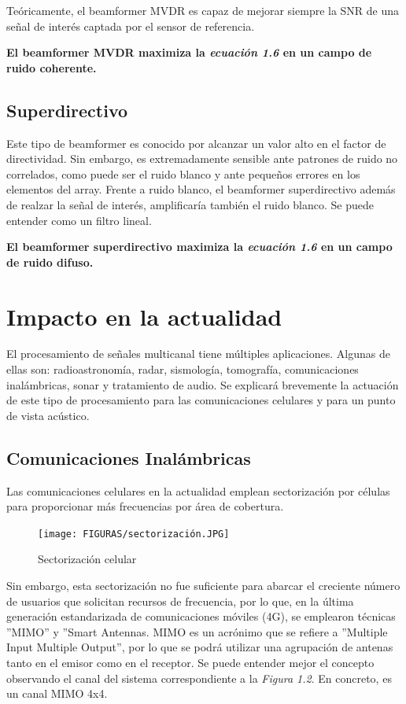 \documentclass[a4paper,11pt]{book}
\begin{document}
	Teóricamente, el beamformer MVDR es capaz de mejorar siempre la SNR de una señal de interés captada por el sensor de referencia.
	
	\textbf{		El beamformer MVDR maximiza la \textit{ecuación 1.6} en un campo de ruido coherente.}
	
	\subsection{Superdirectivo}
	Este tipo de beamformer es conocido por alcanzar un valor alto en el factor de directividad. Sin embargo, es extremadamente sensible ante patrones de ruido no correlados, como puede ser el ruido blanco y ante pequeños errores en los elementos del array. Frente a ruido blanco, el beamformer superdirectivo además de realzar la señal de interés, amplificaría también el ruido blanco. Se puede entender como un filtro lineal.
	
	\textbf{		El beamformer superdirectivo maximiza la \textit{ecuación 1.6} en un campo de ruido difuso.}
	
	\section{Impacto en la actualidad}
	El procesamiento de señales multicanal tiene múltiples aplicaciones. Algunas de ellas son: radioastronomía, radar, sismología, tomografía, comunicaciones inalámbricas, sonar y tratamiento de audio. Se explicará brevemente la actuación de este tipo de procesamiento para las comunicaciones celulares y para un punto de vista acústico.
		\subsection{Comunicaciones Inalámbricas}
		Las comunicaciones celulares en la actualidad emplean sectorización por células para proporcionar más frecuencias por área de cobertura.
		\begin{figure}[hbtp]
		\centering
		\texttt{[image: FIGURAS/sectorización.JPG]}
		\caption{Sectorización celular}
		\end{figure}
		
	
	Sin embargo, esta sectorización no fue suficiente para abarcar el creciente número de usuarios que solicitan recursos de frecuencia, por lo que, en la última generación estandarizada de comunicaciones móviles (4G), se emplearon técnicas ''MIMO'' y ''Smart Antennas. MIMO es un acrónimo que se refiere a ''Multiple Input Multiple Output'', por lo que se podrá utilizar una agrupación de antenas tanto en el emisor como en el receptor. Se puede entender mejor el concepto observando el canal del sistema correspondiente a la \textit{Figura 1.2}. En concreto, es un canal MIMO 4x4.
		
\end{document}
